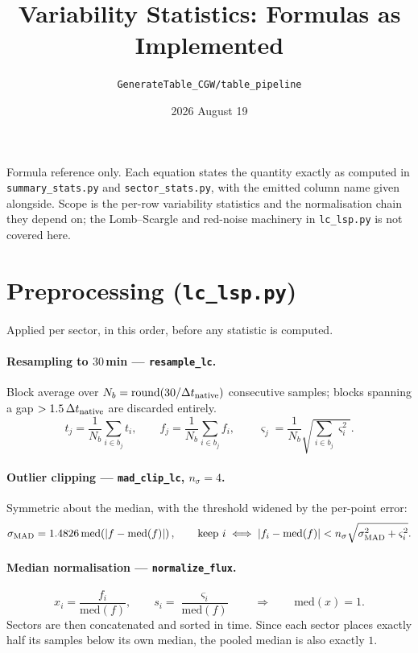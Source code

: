 \documentclass[11pt]{article}
\title{Variability Statistics: Formulas as Implemented}
\author{\texttt{GenerateTable\_CGW/table\_pipeline}}
\date{2026 August 19}
\begin{document}
\maketitle

Formula reference only. Each equation states the quantity exactly as computed in
\texttt{summary\_stats.py} and \texttt{sector\_stats.py}, with the emitted column name
given alongside. Scope is the per-row variability statistics and the normalisation chain
they depend on; the Lomb--Scargle and red-noise machinery in \texttt{lc\_lsp.py} is not
covered here.

\section{Preprocessing (\texttt{lc\_lsp.py})}

Applied per sector, in this order, before any statistic is computed.

\paragraph{Resampling to $30$\,min --- \texttt{resample\_lc}.}
Block average over $N_b = \mathrm{round}(30 / \Delta t_{\rm native})$ consecutive
samples; blocks spanning a gap $>1.5\,\Delta t_{\rm native}$ are discarded entirely.
%
\begin{equation}
  t_j = \frac{1}{N_b}\sum_{i \in b_j} t_i, \qquad
  f_j = \frac{1}{N_b}\sum_{i \in b_j} f_i, \qquad
  \varsigma_j = \frac{1}{N_b}\sqrt{\sum_{i \in b_j} \varsigma_i^{2}} .
\end{equation}

\paragraph{Outlier clipping --- \texttt{mad\_clip\_lc}, $n_\sigma = 4$.}
Symmetric about the median, with the threshold widened by the per-point error:
%
\begin{equation}
  \sigma_{\rm MAD} = 1.4826 \,\mathrm{med}\!\left(|f - \mathrm{med}(f)|\right),
  \qquad
  \text{keep } i \iff
  \left|f_i - \mathrm{med}(f)\right| < n_\sigma \sqrt{\sigma_{\rm MAD}^{2} + \varsigma_i^{2}} .
\end{equation}

\paragraph{Median normalisation --- \texttt{normalize\_flux}.}
%
\begin{equation}
  x_i = \frac{f_i}{\mathrm{med}(f)}, \qquad
  s_i = \frac{\varsigma_i}{\mathrm{med}(f)}
  \qquad\Longrightarrow\qquad \mathrm{med}(x) = 1 .
  \label{eq:norm}
\end{equation}
%
Sectors are then concatenated and sorted in time. Since each sector places exactly half
its samples below its own median, the pooled median is also exactly $1$.
\end{document}
